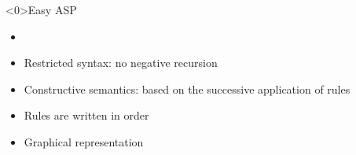 \begin{frame}<0>{Easy ASP}
\begin{itemize}
  \vfill
  \item<1->
  \item<2->Restricted syntax: no negative recursion
  \item<3->Constructive semantics: based on the successive application of rules
  \item<4->Rules are written in order
  \item<5->Graphical representation
\end{itemize}
\end{frame}


